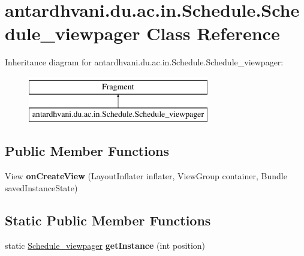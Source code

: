 \hypertarget{classantardhvani_1_1du_1_1ac_1_1in_1_1_schedule_1_1_schedule__viewpager}{}\section{antardhvani.\+du.\+ac.\+in.\+Schedule.\+Schedule\+\_\+viewpager Class Reference}
\label{classantardhvani_1_1du_1_1ac_1_1in_1_1_schedule_1_1_schedule__viewpager}
Inheritance diagram for antardhvani.\+du.\+ac.\+in.\+Schedule.\+Schedule\+\_\+viewpager\+:\begin{figure}[H]
\begin{center}
\leavevmode
\includegraphics[height=2.000000cm]{classantardhvani_1_1du_1_1ac_1_1in_1_1_schedule_1_1_schedule__viewpager}
\end{center}
\end{figure}
\subsection*{Public Member Functions}
\begin{DoxyCompactItemize}
\item 
\hypertarget{classantardhvani_1_1du_1_1ac_1_1in_1_1_schedule_1_1_schedule__viewpager_ab10ce7f59f1b3db6407be6d7cf2921c3}{}View {\bfseries on\+Create\+View} (Layout\+Inflater inflater, View\+Group container, Bundle saved\+Instance\+State)\label{classantardhvani_1_1du_1_1ac_1_1in_1_1_schedule_1_1_schedule__viewpager_ab10ce7f59f1b3db6407be6d7cf2921c3}

\end{DoxyCompactItemize}
\subsection*{Static Public Member Functions}
\begin{DoxyCompactItemize}
\item 
\hypertarget{classantardhvani_1_1du_1_1ac_1_1in_1_1_schedule_1_1_schedule__viewpager_ab3e991b805869c9360119929ffae1351}{}static \hyperlink{classantardhvani_1_1du_1_1ac_1_1in_1_1_schedule_1_1_schedule__viewpager}{Schedule\+\_\+viewpager} {\bfseries get\+Instance} (int position)\label{classantardhvani_1_1du_1_1ac_1_1in_1_1_schedule_1_1_schedule__viewpager_ab3e991b805869c9360119929ffae1351}

\end{DoxyCompactItemize}
